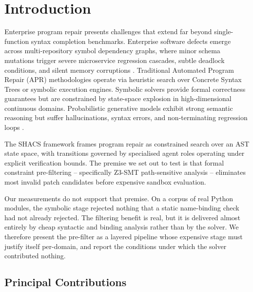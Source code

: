 \documentclass[10pt,twocolumn,letterpaper]{article}
\begin{document}
\section{Introduction}


Enterprise program repair presents challenges that extend far beyond single-function syntax completion benchmarks. Enterprise software defects emerge across multi-repository symbol dependency graphs, where minor schema mutations trigger severe microservice regression cascades, subtle deadlock conditions, and silent memory corruptions \cite{arxiv_2405_01543,arxiv_2203_02155}. Traditional Automated Program Repair (APR) methodologies operate via heuristic search over Concrete Syntax Trees or symbolic execution engines. Symbolic solvers provide formal correctness guarantees but are constrained by state-space explosion in high-dimensional continuous domains. Probabilistic generative models exhibit strong semantic reasoning but suffer hallucinations, syntax errors, and non-terminating regression loops \cite{arxiv_2005_14165}.

The SHACS framework frames program repair as constrained search over an AST state space, with transitions governed by specialised agent roles operating under explicit verification bounds. The premise we set out to test is that formal constraint pre-filtering -- specifically Z3-SMT path-sensitive analysis -- eliminates most invalid patch candidates before expensive sandbox evaluation.

Our measurements do not support that premise. On a corpus of real Python modules, the symbolic stage rejected nothing that a static name-binding check had not already rejected. The filtering benefit is real, but it is delivered almost entirely by cheap syntactic and binding analysis rather than by the solver. We therefore present the pre-filter as a layered pipeline whose expensive stage must justify itself per-domain, and report the conditions under which the solver contributed nothing.


\subsection{Principal Contributions}
\end{document}
